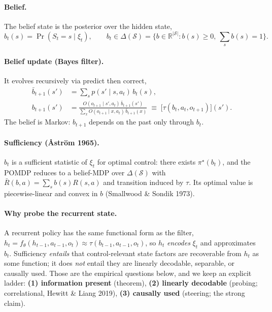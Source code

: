 \documentclass[11pt]{article}
\newcommand{\Sset}{\mathcal{S}}
\begin{document}
\paragraph{Belief.} The belief state is the posterior over the hidden state,
\begin{equation}
b_t(s)=\Pr(S_t=s\mid\xi_t),\qquad b_t\in\Delta(\Sset)=
\Big\{b\in\mathbb{R}^{|\Sset|}: b(s)\ge0,\ \textstyle\sum_s b(s)=1\Big\}.
\end{equation}

\paragraph{Belief update (Bayes filter).} It evolves recursively via predict then
correct,
\begin{align}
\bar b_{t+1}(s') &= \sum_{s} p(s'\mid s,a_t)\,b_t(s), \\
b_{t+1}(s') &= \frac{O(o_{t+1}\mid s',a_t)\,\bar b_{t+1}(s')}
{\sum_{x} O(o_{t+1}\mid x,a_t)\,\bar b_{t+1}(x)}
\;\equiv\; \big[\tau(b_t,a_t,o_{t+1})\big](s').
\end{align}
The belief is Markov: $b_{t+1}$ depends on the past only through $b_t$.

\paragraph{Sufficiency (\AA str\"om 1965).} $b_t$ is a sufficient statistic of
$\xi_t$ for optimal control: there exists $\pi^\star(b_t)$, and the POMDP reduces to
a belief-MDP over $\Delta(\Sset)$ with
$\bar R(b,a)=\sum_s b(s)R(s,a)$ and transition induced by $\tau$. Its optimal value
is piecewise-linear and convex in $b$ (Smallwood \& Sondik 1973).

\paragraph{Why probe the recurrent state.} A recurrent policy has the same
functional form as the filter, $h_t=f_\theta(h_{t-1},a_{t-1},o_t)\approx
\tau(b_{t-1},a_{t-1},o_t)$, so $h_t$ \emph{encodes} $\xi_t$ and approximates $b_t$.
Sufficiency \emph{entails} that control-relevant state factors are recoverable from
$h_t$ as some function; it does \emph{not} entail they are linearly decodable,
separable, or causally used. Those are the empirical questions below, and we keep
an explicit ladder: \textbf{(1) information present} (theorem), \textbf{(2) linearly
decodable} (probing; correlational, Hewitt \& Liang 2019), \textbf{(3) causally
used} (steering; the strong claim).
\end{document}
